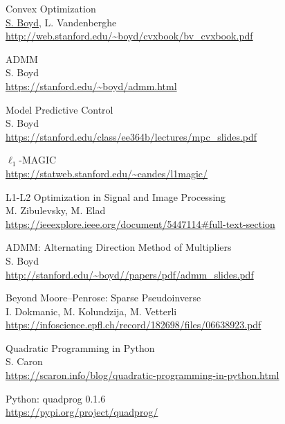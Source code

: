 \documentclass{article}
\begin{document}
\cleardoublepage
{}
{} 
\begin{thebibliography}{1}

        Convex Optimization
        \\
        \href{https://web.stanford.edu/~boyd/}{S. Boyd}, L. Vandenberghe
        \\
        \url{ http://web.stanford.edu/~boyd/cvxbook/bv_cvxbook.pdf }

        ADMM
        \\
        S. Boyd
        \\
        \url{https://stanford.edu/~boyd/admm.html}

        Model Predictive Control
        \\
        S. Boyd
        \\
        \url{ https://stanford.edu/class/ee364b/lectures/mpc_slides.pdf }  

        $\ell_1$-MAGIC
        \\
        \url{ https://statweb.stanford.edu/~candes/l1magic/ }

        L1-L2 Optimization in Signal and Image Processing
        \\
        M. Zibulevsky, M. Elad
        \\
        \url{ https://ieeexplore.ieee.org/document/5447114#full-text-section }
    
        ADMM: Alternating Direction Method of Multipliers
        \\
        S. Boyd
        \\
        \url{ http://stanford.edu/~boyd//papers/pdf/admm_slides.pdf }
    
        Beyond Moore--Penrose: Sparse Pseudoinverse
        \\
        I. Dokmanic, M. Kolundzija, M. Vetterli
        \\
        \url{ https://infoscience.epfl.ch/record/182698/files/06638923.pdf }

        Quadratic Programming in Python
        \\
        S. Caron
        \\
        \url{ https://scaron.info/blog/quadratic-programming-in-python.html }
    
        Python: quadprog 0.1.6
        \\
        \url{ https://pypi.org/project/quadprog/ }
    

\end{thebibliography}
\end{document}
